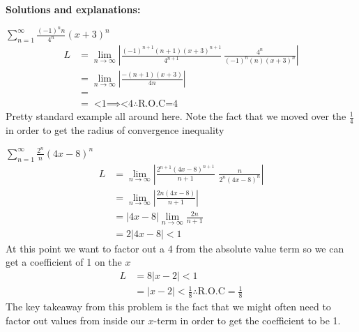 \documentclass[addpoints]{exam}
\begin{document}
\large \textbf{Solutions and explanations:} \begin{questions}
    \question \(\displaystyle
    \sum\limits_{n = 1}^\infty  {\frac{{{{\left( { - 1} \right)}^n}n}}{{{4^n}}}{{\left( {x + 3} \right)}^n}}
    \)
    \begin{align*}
    L & = \mathop {\lim }\limits_{n \to \infty } \left| {\frac{{{{\left( { - 1} \right)}^{n + 1}}\left( {n + 1} \right){{\left( {x + 3} \right)}^{n + 1}}}}{{{4^{n + 1}}}}\,\frac{{{4^n}}}{{{{\left( { - 1} \right)}^n}\left( n \right){{\left( {x + 3} \right)}^n}}}} \right|\\ &  = \mathop {\lim }\limits_{n \to \infty } \left| {\frac{{ - \left( {n + 1} \right)\left( {x + 3} \right)}}{{4n}}} \right| \\
    & = \mathop{
    \left|x+3\right|\lim\limits_{n \to \infty}\left(\frac{n+1}{4n}\right)} \\ 
    & = \mathop{
    \frac{1}{4}\left|x+3\right| < 1 \implies \left|x+3\right| < 4 \therefore \text{R.O.C} = 4}
    \end{align*}
    Pretty standard example all around here. Note the fact that we moved over the $\frac{1}{4}$ in order to get the radius of convergence inequality
    
    \question \(\displaystyle
   \sum\limits_{n = 1}^\infty  {\frac{{{2^n}}}{n}{{\left( {4x - 8} \right)}^n}} 
    \)
    \begin{align*}
    L & = \mathop {\lim }\limits_{n \to \infty } \left| {\frac{{{2^{n + 1}}{{\left( {4x - 8} \right)}^{n + 1}}}}{{n + 1}}\,\,\frac{n}{{{2^n}{{\left( {4x - 8} \right)}^n}}}} \right|\\ &  = \mathop {\lim }\limits_{n \to \infty } \left| {\frac{{2n\left( {4x - 8} \right)}}{{n + 1}}} \right|\\ &  = \left| {4x - 8} \right|\mathop {\lim }\limits_{n \to \infty } \frac{{2n}}{{n + 1}}\\ &  = 2\left| {4x - 8} \right| < 1
    \end{align*}
    At this point we want to factor out a 4 from the absolute value term so we can get a coefficient of 1 on the $x$
    \begin{align*}
        L & = 8\left|x-2\right| < 1 \\
        & = \left|x-2\right| < \frac{1}{8} \therefore \text{R.O.C} = \frac{1}{8}
    \end{align*}
    The key takeaway from this problem is the fact that we might often need to factor out values from inside our $x$-term in order to get the coefficient to be 1.


\end{questions}
\end{document}
